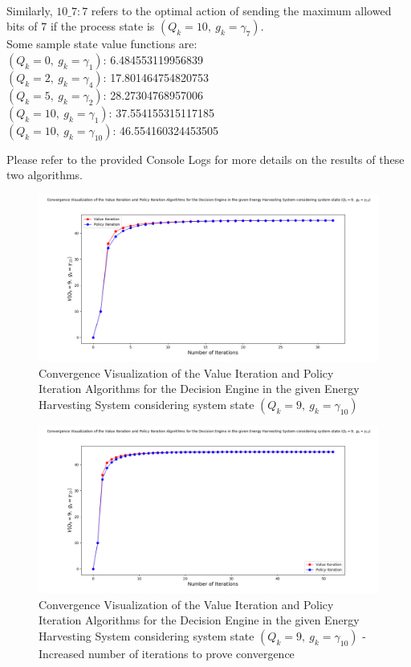 \documentclass[12pt, draftcls, onecolumn]{IEEEtran}
\begin{document}
\begin{itemize}
        \\Similarly, $10\_7: 7$ refers to the optimal action of sending the maximum allowed bits of $7$ if the process state is $(Q_k=10,\ g_k=\gamma_7)$.
        \\Some sample state value functions are:
        \\$(Q_k=0,\ g_k=\gamma_{1})$: 6.484553119956839
        \\$(Q_k=2,\ g_k=\gamma_{4})$: 17.801464754820753
        \\$(Q_k=5,\ g_k=\gamma_{2})$: 28.27304768957006
        \\$(Q_k=10,\ g_k=\gamma_{1})$: 37.554155315117185
        \\$(Q_k=10,\ g_k=\gamma_{10})$: 46.554160324453505
\end{itemize}
Please refer to the provided Console Logs for more details on the results of these two algorithms.
\begin{figure}[t]
\includegraphics[width=1.0\textwidth]{Convergence_Analysis_Energy_Harvesting_Node_Better_Aesthetics.png}
\caption{Convergence Visualization of the Value Iteration and Policy Iteration Algorithms for the Decision Engine in the given Energy Harvesting System considering system state $(Q_k=9,\ g_k=\gamma_{10})$}
\label{fig:mesh1}
\centering
\end{figure}
\begin{figure}[t]
\includegraphics[width=1.0\textwidth]{Convergence_Analysis_Energy_Harvesting_Node_Increased_Confidence.png}
\caption{Convergence Visualization of the Value Iteration and Policy Iteration Algorithms for the Decision Engine in the given Energy Harvesting System considering system state $(Q_k=9,\ g_k=\gamma_{10})$ - Increased number of iterations to prove convergence}
\label{fig:mesh2}
\centering
\end{figure}
\end{document}
